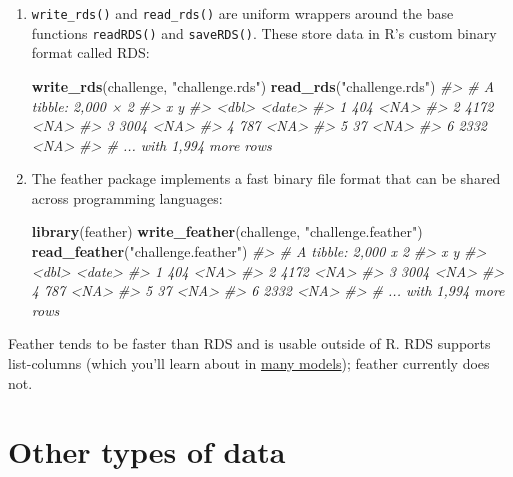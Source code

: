 \documentclass[]{book}
\newenvironment{Shaded}{\begin{snugshade}}{\end{snugshade}}
\newcommand{\KeywordTok}[1]{\textcolor[rgb]{0.13,0.29,0.53}{\textbf{{#1}}}}
\newcommand{\StringTok}[1]{\textcolor[rgb]{0.31,0.60,0.02}{{#1}}}
\newcommand{\CommentTok}[1]{\textcolor[rgb]{0.56,0.35,0.01}{\textit{{#1}}}}
\newcommand{\NormalTok}[1]{{#1}}
\begin{document}
\begin{enumerate}
\def\labelenumi{\arabic{enumi}.}
\item
  \texttt{write\_rds()} and \texttt{read\_rds()} are uniform wrappers
  around the base functions \texttt{readRDS()} and \texttt{saveRDS()}.
  These store data in R's custom binary format called RDS:

\begin{Shaded}
\begin{Highlighting}[]
\KeywordTok{write_rds}\NormalTok{(challenge, }\StringTok{"challenge.rds"}\NormalTok{)}
\KeywordTok{read_rds}\NormalTok{(}\StringTok{"challenge.rds"}\NormalTok{)}
\CommentTok{#> # A tibble: 2,000 × 2}
\CommentTok{#>       x      y}
\CommentTok{#>   <dbl> <date>}
\CommentTok{#> 1   404   <NA>}
\CommentTok{#> 2  4172   <NA>}
\CommentTok{#> 3  3004   <NA>}
\CommentTok{#> 4   787   <NA>}
\CommentTok{#> 5    37   <NA>}
\CommentTok{#> 6  2332   <NA>}
\CommentTok{#> # ... with 1,994 more rows}
\end{Highlighting}
\end{Shaded}
\item
  The feather package implements a fast binary file format that can be
  shared across programming languages:

\begin{Shaded}
\begin{Highlighting}[]
\KeywordTok{library}\NormalTok{(feather)}
\KeywordTok{write_feather}\NormalTok{(challenge, }\StringTok{"challenge.feather"}\NormalTok{)}
\KeywordTok{read_feather}\NormalTok{(}\StringTok{"challenge.feather"}\NormalTok{)}
\CommentTok{#> # A tibble: 2,000 x 2}
\CommentTok{#>       x      y}
\CommentTok{#>   <dbl> <date>}
\CommentTok{#> 1   404   <NA>}
\CommentTok{#> 2  4172   <NA>}
\CommentTok{#> 3  3004   <NA>}
\CommentTok{#> 4   787   <NA>}
\CommentTok{#> 5    37   <NA>}
\CommentTok{#> 6  2332   <NA>}
\CommentTok{#> # ... with 1,994 more rows}
\end{Highlighting}
\end{Shaded}
\end{enumerate}

Feather tends to be faster than RDS and is usable outside of R. RDS
supports list-columns (which you'll learn about in
\protect\hyperlink{many-models}{many models}); feather currently does
not.

\section{Other types of data}\label{other-types-of-data}
\end{document}
